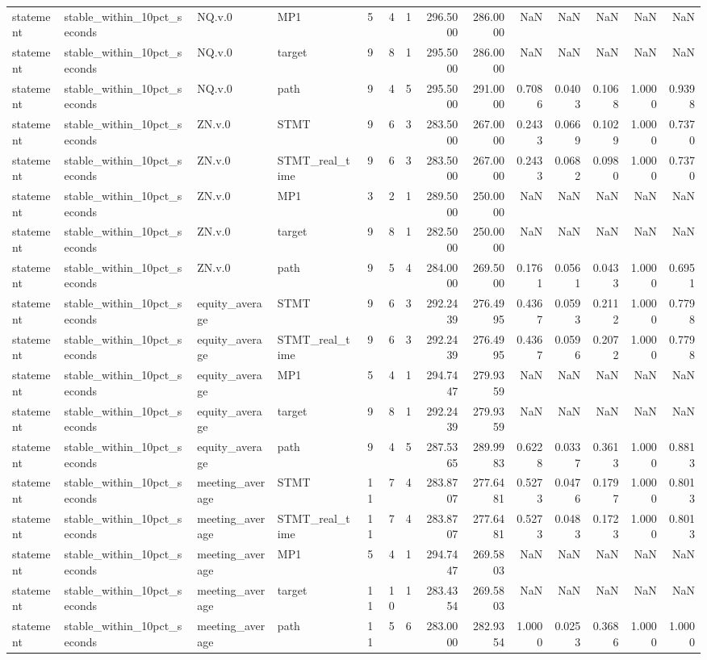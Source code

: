 \begin{tabular}{llllrrrrrrrrrr}
statement & stable_within_10pct_seconds & NQ.v.0 & MP1 & 5 & 4 & 1 & 296.5000 & 286.0000 & NaN & NaN & NaN & NaN & NaN \\
statement & stable_within_10pct_seconds & NQ.v.0 & target & 9 & 8 & 1 & 295.5000 & 286.0000 & NaN & NaN & NaN & NaN & NaN \\
statement & stable_within_10pct_seconds & NQ.v.0 & path & 9 & 4 & 5 & 295.5000 & 291.0000 & 0.7086 & 0.0403 & 0.1068 & 1.0000 & 0.9398 \\
statement & stable_within_10pct_seconds & ZN.v.0 & STMT & 9 & 6 & 3 & 283.5000 & 267.0000 & 0.2433 & 0.0669 & 0.1029 & 1.0000 & 0.7370 \\
statement & stable_within_10pct_seconds & ZN.v.0 & STMT_real_time & 9 & 6 & 3 & 283.5000 & 267.0000 & 0.2433 & 0.0682 & 0.0980 & 1.0000 & 0.7370 \\
statement & stable_within_10pct_seconds & ZN.v.0 & MP1 & 3 & 2 & 1 & 289.5000 & 250.0000 & NaN & NaN & NaN & NaN & NaN \\
statement & stable_within_10pct_seconds & ZN.v.0 & target & 9 & 8 & 1 & 282.5000 & 250.0000 & NaN & NaN & NaN & NaN & NaN \\
statement & stable_within_10pct_seconds & ZN.v.0 & path & 9 & 5 & 4 & 284.0000 & 269.5000 & 0.1761 & 0.0561 & 0.0433 & 1.0000 & 0.6951 \\
statement & stable_within_10pct_seconds & equity_average & STMT & 9 & 6 & 3 & 292.2439 & 276.4995 & 0.4367 & 0.0593 & 0.2112 & 1.0000 & 0.7798 \\
statement & stable_within_10pct_seconds & equity_average & STMT_real_time & 9 & 6 & 3 & 292.2439 & 276.4995 & 0.4367 & 0.0596 & 0.2072 & 1.0000 & 0.7798 \\
statement & stable_within_10pct_seconds & equity_average & MP1 & 5 & 4 & 1 & 294.7447 & 279.9359 & NaN & NaN & NaN & NaN & NaN \\
statement & stable_within_10pct_seconds & equity_average & target & 9 & 8 & 1 & 292.2439 & 279.9359 & NaN & NaN & NaN & NaN & NaN \\
statement & stable_within_10pct_seconds & equity_average & path & 9 & 4 & 5 & 287.5365 & 289.9983 & 0.6228 & 0.0337 & 0.3613 & 1.0000 & 0.8813 \\
statement & stable_within_10pct_seconds & meeting_average & STMT & 11 & 7 & 4 & 283.8707 & 277.6481 & 0.5273 & 0.0476 & 0.1797 & 1.0000 & 0.8013 \\
statement & stable_within_10pct_seconds & meeting_average & STMT_real_time & 11 & 7 & 4 & 283.8707 & 277.6481 & 0.5273 & 0.0483 & 0.1723 & 1.0000 & 0.8013 \\
statement & stable_within_10pct_seconds & meeting_average & MP1 & 5 & 4 & 1 & 294.7447 & 269.5803 & NaN & NaN & NaN & NaN & NaN \\
statement & stable_within_10pct_seconds & meeting_average & target & 11 & 10 & 1 & 283.4354 & 269.5803 & NaN & NaN & NaN & NaN & NaN \\
statement & stable_within_10pct_seconds & meeting_average & path & 11 & 5 & 6 & 283.0000 & 282.9354 & 1.0000 & 0.0253 & 0.3686 & 1.0000 & 1.0000 \\
\bottomrule
\end{tabular}
